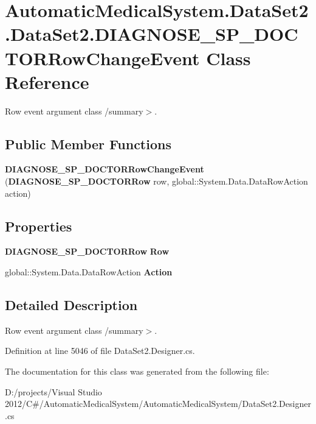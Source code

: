 \section{AutomaticMedicalSystem.DataSet2.DataSet2.DIAGNOSE\_\-SP\_\-DOCTORRowChangeEvent Class Reference}
\label{class_automatic_medical_system_1_1_data_set2_1_1_d_i_a_g_n_o_s_e___s_p___d_o_c_t_o_r_row_change_event}
Row event argument class /summary$>$.  


\subsection*{Public Member Functions}
\begin{CompactItemize}
\item 
\textbf{DIAGNOSE\_\-SP\_\-DOCTORRowChangeEvent} ({\bf DIAGNOSE\_\-SP\_\-DOCTORRow} row, global::System.Data.DataRowAction action)\label{class_automatic_medical_system_1_1_data_set2_1_1_d_i_a_g_n_o_s_e___s_p___d_o_c_t_o_r_row_change_event_0cffbe22025da9ea0b91dfa9ab630238}

\end{CompactItemize}
\subsection*{Properties}
\begin{CompactItemize}
\item 
{\bf DIAGNOSE\_\-SP\_\-DOCTORRow} \textbf{Row}\hspace{0.3cm}{\tt  [get]}\label{class_automatic_medical_system_1_1_data_set2_1_1_d_i_a_g_n_o_s_e___s_p___d_o_c_t_o_r_row_change_event_16b9f735e4550617102f29b155ca35db}

\item 
global::System.Data.DataRowAction \textbf{Action}\hspace{0.3cm}{\tt  [get]}\label{class_automatic_medical_system_1_1_data_set2_1_1_d_i_a_g_n_o_s_e___s_p___d_o_c_t_o_r_row_change_event_218ea101f60618ab06117b37e4b0d474}

\end{CompactItemize}


\subsection{Detailed Description}
Row event argument class /summary$>$. 

Definition at line 5046 of file DataSet2.Designer.cs.

The documentation for this class was generated from the following file:\begin{CompactItemize}
\item 
D:/projects/Visual Studio 2012/C\#/AutomaticMedicalSystem/AutomaticMedicalSystem/DataSet2.Designer.cs\end{CompactItemize}
